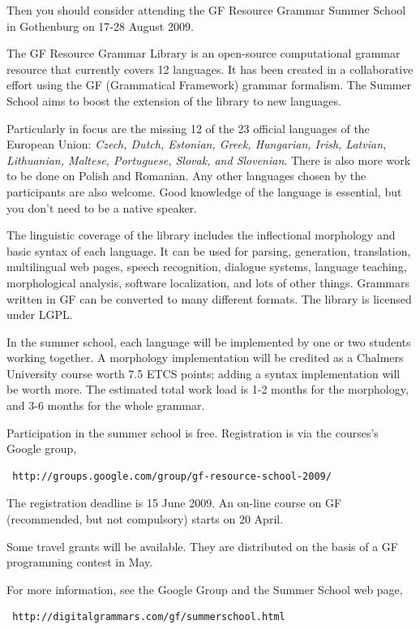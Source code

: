 \documentclass[12pt]{article}
\begin{document}
Then you should consider attending the GF Resource Grammar Summer School 
in Gothenburg on 17-28 August 2009.

The GF Resource Grammar Library is an open-source computational grammar 
resource that currently covers 12 languages. It has been created in 
a collaborative effort using the GF (Grammatical Framework) grammar formalism.
The Summer School aims to boost the extension of the library to new languages.

Particularly in focus are the missing 12 of the 23 official languages of the 
European Union: \textit{Czech, Dutch, 
Estonian, Greek, Hungarian, Irish, Latvian, Lithuanian,
Maltese, Portuguese, Slovak, and Slovenian}. There is also more work to
be done on Polish and Romanian.
Any other languages chosen by the participants are also welcome.
Good knowledge of the language is essential, but you don't need to be a 
native speaker.

The linguistic coverage of the library includes the inflectional morphology
and basic syntax of each language. It can be used for parsing,
generation, translation, multilingual web pages, 
speech recognition, dialogue systems, language teaching, morphological
analysis, software localization, and lots of other things. 
Grammars written in GF can be converted to many different formats. 
The library is licensed under LGPL.

In the summer school, each language will be implemented by one or two students
working together. A morphology implementation will be credited
as a Chalmers University
course worth 7.5 ETCS points; adding a syntax implementation
will be worth more. The estimated total work load is 1-2 months for the
morphology, and 3-6 months for the whole grammar.

Participation in the summer school is free. 
Registration is via the courses's Google group,

\begin{verbatim}
 http://groups.google.com/group/gf-resource-school-2009/
\end{verbatim}
The registration deadline is 15 June 2009. An on-line course on GF (recommended,
but not compulsory) starts on 20 April.

Some travel grants will be available. They are distributed on the basis of a
GF programming contest in May.

For more information, see the Google Group and the Summer School web page,

\begin{verbatim}
 http://digitalgrammars.com/gf/summerschool.html
\end{verbatim}

\end{document}
